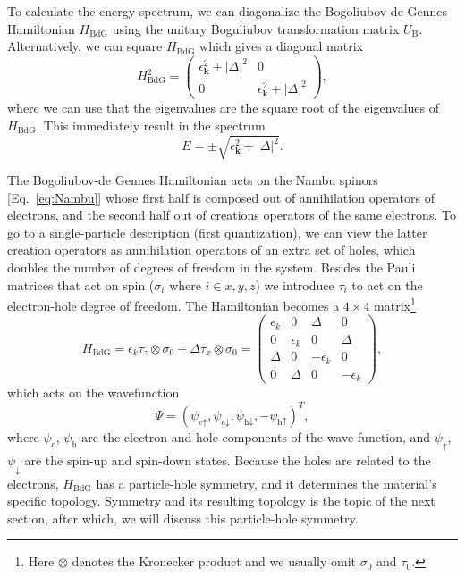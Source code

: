 To calculate the energy spectrum, we can diagonalize the Bogoliubov-de Gennes Hamiltonian $H_{\textrm{BdG}}$ using the unitary Boguliubov transformation matrix $U_{\textrm{B}}$.  %
Alternatively, we can square $H_{\textrm{BdG}}$ which gives a diagonal matrix
\begin{equation}
H_{\textrm{BdG}}^{2}=\left(\begin{array}{cc}
\epsilon_{\bm{k}}^{2}+\left|\Delta\right|^{2} & 0\\
0 & \epsilon_{\bm{k}}^{2}+\left|\Delta\right|^{2}
\end{array}\right),
\end{equation}
where we can use that the eigenvalues are the square root of the eigenvalues of $H_{\textrm{BdG}}$.
This immediately result in the spectrum
\begin{equation}
E=\pm\sqrt{\epsilon_{\bm{k}}^{2}+\left|\Delta\right|^{2}}.\label{eq:SC_spectrum}
\end{equation}

The Bogoliubov-de Gennes Hamiltonian acts on the Nambu spinors [Eq.~\eqref{eq:Nambu}] whose first half is composed out of annihilation operators of electrons, and the second half out of creations operators of the same electrons.
To go to a single-particle description (first quantization), we can view the latter creation operators as annihilation operators of an extra set of holes, which doubles the number of degrees of freedom in the system.
Besides the Pauli matrices that act on spin ($\sigma_{i}$ where $i\in x,y,z$) we introduce $\tau_{i}$ to act on the electron-hole degree of freedom.
The Hamiltonian becomes a $4\times4$ matrix\footnote{Here $\otimes$ denotes the Kronecker product and we usually omit $\sigma_{0}$ and $\tau_{0}$.}
\begin{equation}
H_{\textrm{BdG}}=\epsilon_{k}\tau_{z}\otimes\sigma_{0}+\Delta\tau_{x}\otimes\sigma_{0}=\left(\begin{array}{cccc}
\epsilon_{k} & 0 & \Delta & 0\\
0 & \epsilon_{k} & 0 & \Delta\\
\Delta & 0 & -\epsilon_{k} & 0\\
0 & \Delta & 0 & -\epsilon_{k}
\end{array}\right),\label{eq:H_BdG_sc}
\end{equation}
which acts on the wavefunction
\begin{equation}
\Psi=\left(\psi_{\textrm{e}\uparrow},\psi_{\textrm{e}\downarrow},\psi_{\textrm{h}\downarrow},-\psi_{\textrm{h}\uparrow}\right)^{T},\label{eq:4wf}
\end{equation}
where $\psi_{\textrm{e}}$, $\psi_{\textrm{h}}$ are the electron and hole components of the wave function, and $\psi_{\uparrow}$, $\psi_{\downarrow}$ are the spin-up and spin-down states.
Because the holes are related to the electrons, $H_{\textrm{BdG}}$ has a particle-hole symmetry, and it determines the material's specific topology.
Symmetry and its resulting topology is the topic of the next section, after which, we will discuss this particle-hole symmetry.

